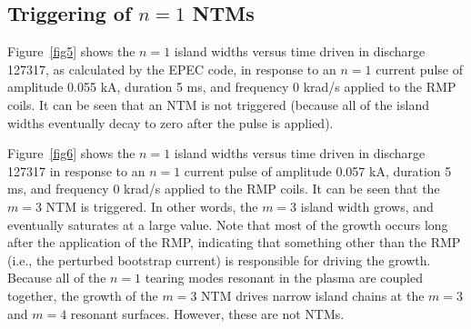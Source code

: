 \documentclass[12pt,prb,aps]{revtex4-1}
\begin{document}
\subsection{Triggering of $n=1$ NTMs}
Figure~\ref{fig5} shows the $n=1$ island widths versus time driven in discharge 127317, as calculated by the EPEC code, 
in response to an $n=1$ current pulse of amplitude 0.055 kA, duration 5 ms, and frequency 0 krad/s applied to the
RMP coils. It can be seen that an NTM is not triggered (because all of the island widths eventually decay to zero after the pulse is
applied). 

Figure~\ref{fig6} shows the $n=1$ island widths versus time driven in discharge 127317 
in response to an $n=1$ current pulse of amplitude 0.057 kA, duration 5 ms, and frequency 0 krad/s applied to the
RMP coils. It can be seen that the $m=3$ NTM is triggered. In other words, the $m=3$ island width grows, and eventually 
saturates at a large value. Note that most of the growth occurs long after the application of the RMP, indicating
that something other than the RMP (i.e., the perturbed bootstrap current) is responsible for driving the growth. Because all of the
$n=1$ tearing modes resonant in the plasma are coupled together, the growth of the $m=3$ NTM drives narrow 
island chains at the $m=3$ and $m=4$ resonant surfaces. However, these are not NTMs. 
\end{document}
